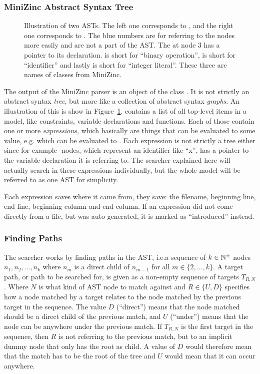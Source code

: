 \documentclass[a4paper,12pt]{article}
\begin{document}
\subsubsection{MiniZinc Abstract Syntax Tree}
\begin{figure}[ht]
  \centering
  
  \caption{Illustration of two ASTs. The left one corresponds to ,
    and the right one corresponds to . The blue numbers are
    for referring to the nodes more easily and are not a part of the AST. The  at
    node 3 has a pointer to its declaration.  is short for ``binary operation'',
     is short for ``identifier'' and lastly  is short for ``integer
    literal''. These three are names of classes from MiniZinc.}%
  \label{fig:ast:searcher}
\end{figure}

The output of the MiniZinc parser is an object of the class . It is not strictly
an abstract syntax \emph{tree}, but more like a collection of abstract syntax
\emph{graphs}. An illustration of this is show in Figure~\ref{fig:ast:searcher}.
 contains a list of all top-level items in a model, like constraints, variable
declarations and functions. Each of those contain one or more \emph{expressions}, which
basically are things that can be evaluated to some value, e.g.\@ {} which can be
evaluated to . Each expression is not strictly a tree either since for example
-nodes, which represent an identifier like ``x'', has a pointer to the variable
declaration it is referring to. The searcher explained here will actually search in these
expressions individually, but the whole model will be referred to as one AST for
simplicity.

Each expression saves where it came from, they save: the filename, beginning line, end
line, beginning column and end column. If an expression did not come directly from a file,
but was auto generated, it is marked as ``introduced'' instead.

\subsubsection{Finding Paths}\label{sec:paths}
The searcher works by finding paths in the AST, i.e.\@ a sequence of $k \in \mathbb{N}^+$
nodes $n_1, n_2, \dots ,n_k$ where $n_m$ is a direct child of $n_{m-1}$ for
all $m \in \{2,\dots,k\}$. A target path, or path to be searched for, is given as a
non-empty sequence of targets $T_{R,N}$. Where $N$ is what kind of AST node to match
against and $R \in \{U,D\}$ specifies how a node matched by a target relates to the node
matched by the previous target in the sequence. The value $D$ (``direct'') means that the
node matched should be a direct child of the previous match, and $U$ (``under'') means
that the node can be anywhere under the previous match. If $T_{R,N}$ is the first target
in the sequence, then $R$ is not referring to the previous match, but to an implicit dummy node
that only has the root as child.
A value of $D$ would therefore mean that the match has to be the root of the tree and $U$ would mean
that it can occur anywhere.
\end{document}

